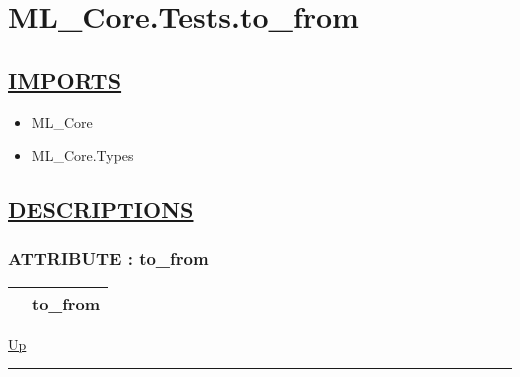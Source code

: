 \chapter*{ML\_Core.Tests.to\_from}
\hypertarget{ecldoc:toc:ML_Core.Tests.to_from}{}

\section*{\underline{IMPORTS}}
\begin{itemize}
\item ML\_Core
\item ML\_Core.Types
\end{itemize}

\section*{\underline{DESCRIPTIONS}}
\subsection*{ATTRIBUTE : to\_from}
\hypertarget{ecldoc:ml_core.tests.to_from}{}

{\renewcommand{\arraystretch}{1.5}
\begin{tabularx}{\textwidth}{|>{\raggedright\arraybackslash}l|X|}
\hline
\hspace{0pt} & to\_from \\
\hline
\end{tabularx}
}

\hyperlink{ecldoc:toc:ML_Core/Tests}{Up}

\par


\rule{\textwidth}{0.4pt}
